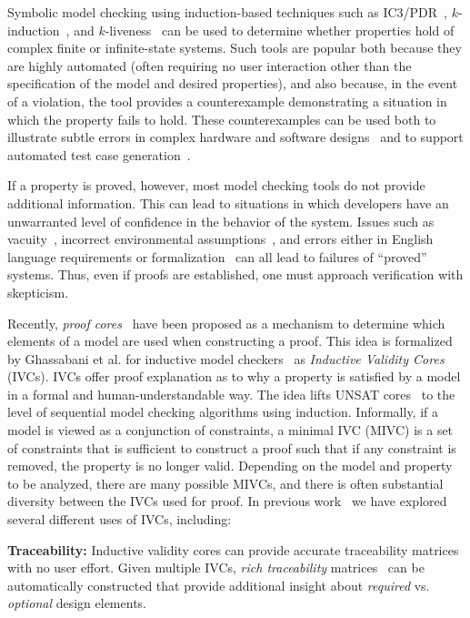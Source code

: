 Symbolic model checking using induction-based techniques such as IC3/PDR~\cite{Een2011:PDR}, $k$-induction~\cite{SheeranSS00}, and $k$-liveness~\cite{conf/fmcad/ClaessenS12} can be used to determine whether properties hold of complex finite or infinite-state systems.  Such tools are popular both because they are highly automated (often requiring no user interaction other than the specification of the model and desired properties), and also because, in the event of a violation, the tool provides a counterexample demonstrating a situation in which the property fails to hold.  These counterexamples can be used both to illustrate subtle errors in complex hardware and software designs~\cite{hilt2013,McMillan99:compositional,Miller10:CACM} and to support automated test case generation~\cite{Whalen13:OMCDC,You15:dse}.

If a property is proved, however, most model checking tools do not provide additional information.  This can lead to situations in which developers have an unwarranted level of confidence in the behavior of the system.  Issues such as vacuity~\cite{Kupferman03:Vacuity}, incorrect environmental assumptions~\cite{Whalen07:FMICS}, and errors either in English language requirements or formalization~\cite{Pike06:axioms} can all lead to failures of ``proved'' systems.  Thus, even if proofs are established, one must approach verification with skepticism.

Recently, {\em proof cores}~\cite{jasper_gold} have been proposed as a mechanism to determine which elements of a model are used when constructing a proof.  This idea is formalized by Ghassabani et al. for inductive model checkers~\cite{Ghass16} as {\em Inductive Validity Cores} (IVCs). IVCs offer proof explanation as to why a property is satisfied by a model in a formal and human-understandable way.  The idea lifts UNSAT cores~\cite{zhang2003extracting}
to the level of sequential model checking algorithms using induction.  Informally, if a model is viewed as a conjunction of constraints,
a minimal IVC (MIVC) is a set of constraints that is sufficient to construct a proof such that if any constraint is removed, the property is no longer valid.
%
Depending on the model and property to be analyzed, there are many possible MIVCs, and there is often substantial diversity between the IVCs used for proof.
%
In previous work~\cite{Ghass16,Murugesan16:renext,Ghass17Cov,Ghass17AllIVCs} we have explored several different uses of IVCs, including:

\noindent \textbf{Traceability: } %
Inductive validity cores can provide accurate traceability matrices with no user effort.  Given multiple IVCs, {\em rich traceability} matrices~\cite{Murugesan16:renext} can be automatically constructed that provide additional insight about {\em required} vs. {\em optional} design elements.

